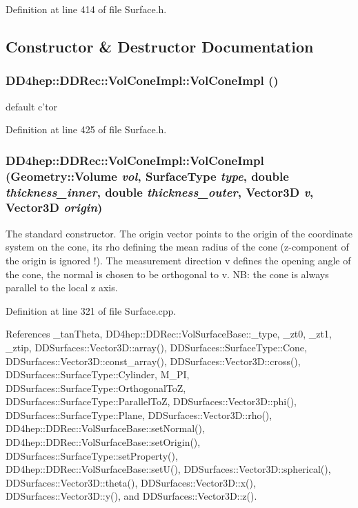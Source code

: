 Definition at line 414 of file Surface.h.

\subsection{Constructor \& Destructor Documentation}
\hypertarget{class_d_d4hep_1_1_d_d_rec_1_1_vol_cone_impl_a53aac2e0c112ae12be098853a5b93d64}{
\subsubsection[{VolConeImpl}]{\setlength{\rightskip}{0pt plus 5cm}DD4hep::DDRec::VolConeImpl::VolConeImpl ()}}
\label{class_d_d4hep_1_1_d_d_rec_1_1_vol_cone_impl_a53aac2e0c112ae12be098853a5b93d64}


default c'tor 

Definition at line 425 of file Surface.h.\hypertarget{class_d_d4hep_1_1_d_d_rec_1_1_vol_cone_impl_acdcb9ac446fc79054df650fa90a0d381}{
\subsubsection[{VolConeImpl}]{\setlength{\rightskip}{0pt plus 5cm}DD4hep::DDRec::VolConeImpl::VolConeImpl ({\bf Geometry::Volume} {\em vol}, \/  {\bf SurfaceType} {\em type}, \/  double {\em thickness\_\-inner}, \/  double {\em thickness\_\-outer}, \/  {\bf Vector3D} {\em v}, \/  {\bf Vector3D} {\em origin})}}
\label{class_d_d4hep_1_1_d_d_rec_1_1_vol_cone_impl_acdcb9ac446fc79054df650fa90a0d381}
The standard constructor. The origin vector points to the origin of the coordinate system on the cone, its rho defining the mean radius of the cone (z-\/component of the origin is ignored !). The measurement direction v defines the opening angle of the cone, the normal is chosen to be orthogonal to v. NB: the cone is always parallel to the local z axis. 

Definition at line 321 of file Surface.cpp.

References \_\-tanTheta, DD4hep::DDRec::VolSurfaceBase::\_\-type, \_\-zt0, \_\-zt1, \_\-ztip, DDSurfaces::Vector3D::array(), DDSurfaces::SurfaceType::Cone, DDSurfaces::Vector3D::const\_\-array(), DDSurfaces::Vector3D::cross(), DDSurfaces::SurfaceType::Cylinder, M\_\-PI, DDSurfaces::SurfaceType::OrthogonalToZ, DDSurfaces::SurfaceType::ParallelToZ, DDSurfaces::Vector3D::phi(), DDSurfaces::SurfaceType::Plane, DDSurfaces::Vector3D::rho(), DD4hep::DDRec::VolSurfaceBase::setNormal(), DD4hep::DDRec::VolSurfaceBase::setOrigin(), DDSurfaces::SurfaceType::setProperty(), DD4hep::DDRec::VolSurfaceBase::setU(), DDSurfaces::Vector3D::spherical(), DDSurfaces::Vector3D::theta(), DDSurfaces::Vector3D::x(), DDSurfaces::Vector3D::y(), and DDSurfaces::Vector3D::z().

